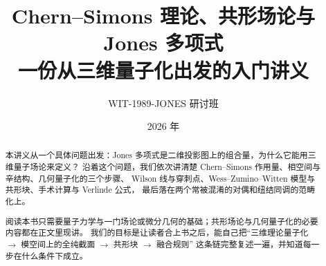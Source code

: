 

\title{\bfseries Chern--Simons 理论、共形场论与 Jones 多项式\\[6pt]
\large 一份从三维量子化出发的入门讲义}
\author{WIT-1989-JONES 研讨班}
\date{2026 年}



\maketitle

\begin{abstract}
\noindent
本讲义从一个具体问题出发：Jones 多项式是二维投影图上的组合量，为什么它能用三维量子场论来定义？
沿着这个问题，我们依次讲清楚 Chern--Simons 作用量、相空间与辛结构、几何量子化的三个步骤、
Wilson 线与穿刺点、Wess--Zumino--Witten 模型与共形块、手术计算与 Verlinde 公式，
最后落在两个常被混淆的对偶和纽结同调的范畴化上。

阅读本书只需要量子力学与一门场论或微分几何的基础；共形场论与几何量子化的必要内容都在正文里现讲。
我们的目标是让读者合上书之后，能自己把“三维理论量子化 $\to$ 模空间上的全纯截面 $\to$ 共形块 $\to$ 融合规则”
这条链完整复述一遍，并知道每一步在什么条件下成立。
\end{abstract}

\tableofcontents
\newpage















